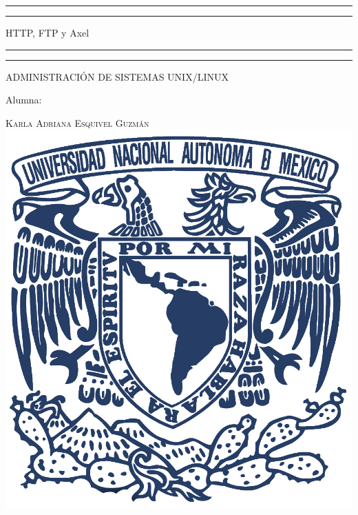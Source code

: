 \documentclass[a4paper, 11pt, oneside]{article}
\begin{document}
 

\begin{titlepage} 

	\centering 
	
	\scshape 
	
	\vspace*{\baselineskip} 
	
	
	
	\rule{\textwidth}{1.6pt}\vspace*{-\baselineskip}\vspace*{2pt} 
	\rule{\textwidth}{0.4pt} 
	
	\vspace{0.75\baselineskip} 
	
	{\LARGE HTTP, FTP y Axel}	
	\vspace{0.75\baselineskip} 
	
	\rule{\textwidth}{0.4pt}\vspace*{-\baselineskip}\vspace{3.2pt}
	\rule{\textwidth}{1.6pt} 
	
	\vspace{2\baselineskip} 
	

	ADMINISTRACIÓN DE SISTEMAS UNIX/LINUX
	
	\vspace*{3\baselineskip} 
	
	
	
	Alumna:
	
	\vspace{0.5\baselineskip} 
	
	{\scshape\Large Karla Adriana Esquivel Guzmán \\} 
	\vspace{0.5\baselineskip} 
	\vfill
	\includegraphics{unam.jpg}
	

\end{titlepage}
\end{document}

